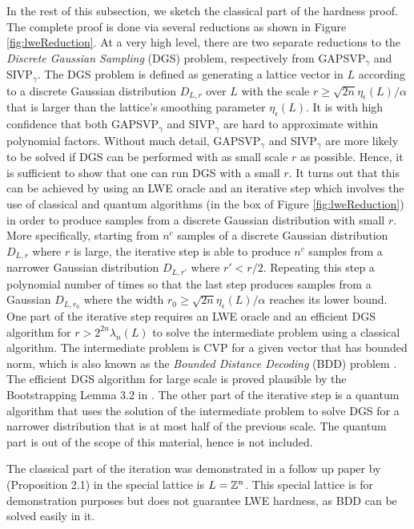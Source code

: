 \documentclass[../main.tex]{subfiles}
\begin{document}
In the rest of this subsection, we sketch the classical part of the hardness proof. The complete proof is done via several reductions as shown in Figure \ref{fig:lweReduction}.
At a very high level, there are two separate reductions to the \textit{Discrete Gaussian Sampling} (DGS) problem, respectively from GAPSVP$_{\gamma}$ and SIVP$_{\gamma}$. The DGS problem is defined as generating a lattice vector in $L$ according to a discrete Gaussian distribution $D_{L,r}$ over $L$ with the scale $r \ge \sqrt{2n} \eta_{\epsilon}(L)/\alpha$ that is larger than the lattice's smoothing parameter $\eta_{\epsilon}(L)$. 
It is with high confidence that both GAPSVP$_{\gamma}$ and SIVP$_{\gamma}$ are hard to approximate within polynomial factors.
Without much detail, GAPSVP$_{\gamma}$ and SIVP$_{\gamma}$ are more likely to be solved if DGS can be performed with as small scale $r$ as possible. Hence, it is sufficient to show that one can run DGS with a small $r$.
It turns out that this can be achieved by using an LWE oracle and an iterative step which involves the use of classical and quantum algorithms (in the box of Figure \ref{fig:lweReduction}) in order to produce samples from a discrete Gaussian distribution with small $r$. More specifically, starting from $n^c$ samples of a discrete Gaussian distribution $D_{L, r}$ where $r$ is large, the iterative step is able to produce $n^c$ samples from a narrower Gaussian distribution $D_{L, r'}$ where $r' < r/2$. Repeating this step a polynomial number of times so that the last step produces samples from a Gaussian $D_{L, r_0}$ where the width $r_0 \ge \sqrt{2n} \eta_{\epsilon}(L)/\alpha$ reaches its lower bound. One part of the iterative step requires an LWE oracle and an efficient DGS algorithm for $r > 2^{2n} \lambda_n(L)$ to solve the intermediate problem using a classical algorithm. The intermediate problem is CVP for a given vector that has bounded norm, which is also known as the \textit{Bounded Distance Decoding} (BDD) problem . The efficient DGS algorithm for large scale is proved plausible by the Bootstrapping Lemma 3.2 in \citep{regev2009lattices}.  The other part of the iterative step is a quantum algorithm that uses the solution of the intermediate problem to solve DGS for a narrower distribution that is at most half of the previous scale. The quantum part is out of the scope of this material, hence is not included. 

The classical part of the iteration was demonstrated in a follow up paper by \cite{regev2010learning} (Proposition 2.1) in the special lattice is $L=\mathbb{Z}^n$. This special lattice is for demonstration purposes but does not guarantee LWE hardness, as BDD can be solved easily in it. 
\end{document}

